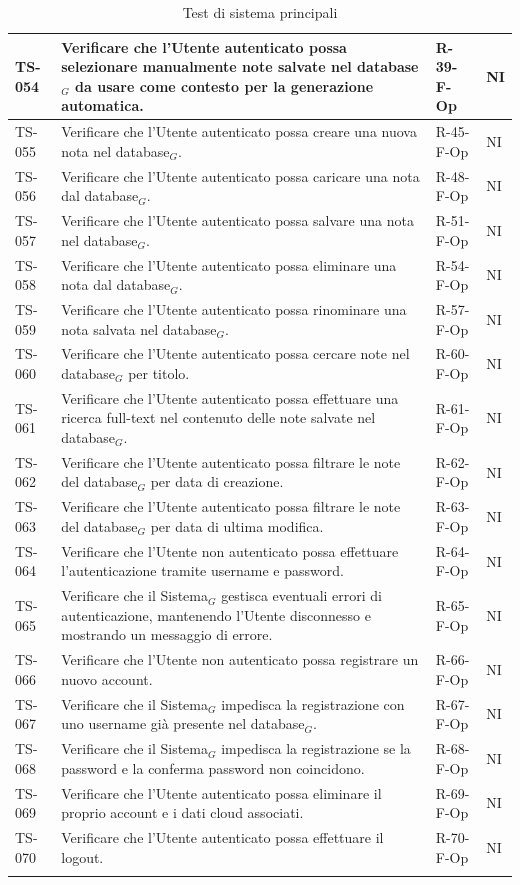 \documentclass[a4paper, 10pt, colorlinks=true, linkcolor=black, urlcolor=blue, citecolor=blue, hidelinks]{article}
\begin{document}
\begin{longtable}{|p{1.4cm}|p{7.8cm}|p{2.3cm}|p{1.2cm}|}
    TS-054 & Verificare che l'Utente autenticato possa selezionare manualmente note salvate nel database$_G$ da usare come contesto per la generazione automatica. & R-39-F-Op & NI \\
    \hline
    TS-055 & Verificare che l'Utente autenticato possa creare una nuova nota nel database$_G$. & R-45-F-Op & NI \\
    \hline
    TS-056 & Verificare che l'Utente autenticato possa caricare una nota dal database$_G$. & R-48-F-Op & NI \\
    \hline
    TS-057 & Verificare che l'Utente autenticato possa salvare una nota nel database$_G$. & R-51-F-Op & NI \\
    \hline
    TS-058 & Verificare che l'Utente autenticato possa eliminare una nota dal database$_G$. & R-54-F-Op & NI \\
    \hline
    TS-059 & Verificare che l'Utente autenticato possa rinominare una nota salvata nel database$_G$. & R-57-F-Op & NI \\
    \hline
    TS-060 & Verificare che l'Utente autenticato possa cercare note nel database$_G$ per titolo. & R-60-F-Op & NI \\
    \hline
    TS-061 & Verificare che l'Utente autenticato possa effettuare una ricerca full-text nel contenuto delle note salvate nel database$_G$. & R-61-F-Op & NI \\
    \hline
    TS-062 & Verificare che l'Utente autenticato possa filtrare le note del database$_G$ per data di creazione. & R-62-F-Op & NI \\
    \hline
    TS-063 & Verificare che l'Utente autenticato possa filtrare le note del database$_G$ per data di ultima modifica. & R-63-F-Op & NI \\
    \hline
    TS-064 & Verificare che l'Utente non autenticato possa effettuare l'autenticazione tramite username e password. & R-64-F-Op & NI \\
    \hline
    TS-065 & Verificare che il Sistema$_G$ gestisca eventuali errori di autenticazione, mantenendo l'Utente disconnesso e mostrando un messaggio di errore. & R-65-F-Op & NI \\
    \hline
    TS-066 & Verificare che l'Utente non autenticato possa registrare un nuovo account. & R-66-F-Op & NI \\
    \hline
    TS-067 & Verificare che il Sistema$_G$ impedisca la registrazione con uno username già presente nel database$_G$. & R-67-F-Op & NI \\
    \hline
    TS-068 & Verificare che il Sistema$_G$ impedisca la registrazione se la password e la conferma password non coincidono. & R-68-F-Op & NI \\
    \hline
    TS-069 & Verificare che l'Utente autenticato possa eliminare il proprio account e i dati cloud associati. & R-69-F-Op & NI \\
    \hline
    TS-070 & Verificare che l'Utente autenticato possa effettuare il logout. & R-70-F-Op & NI \\
    \hline
   \caption{Test di sistema principali} 
\end{longtable}
\end{document}
